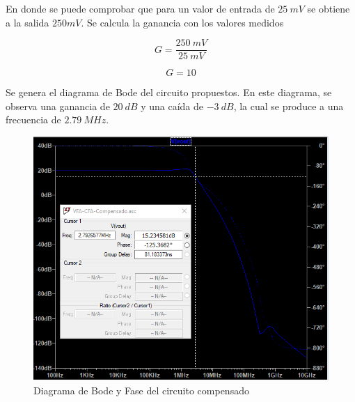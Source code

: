 \hspace{1mm} En donde se puede comprobar que para un valor de entrada de \( 25~mV \) se obtiene a la salida \( 250mV\). Se calcula la ganancia con los valores medidos

\begin{equation}
    G = \frac{250~mV}{25~mV}
\end{equation}

\begin{equation}
    \boxed{
    G = 10
    }
\end{equation}

\hspace{1mm} Se genera el diagrama de Bode del circuito propuestos. En este diagrama, se observa una ganancia de \(20~dB\) y una caída de \(-3~dB\), la cual se produce a una frecuencia de \(2.79~MHz\).

\begin{figure}[H]
    \centering
    \includegraphics[width=0.7\linewidth]{VFA-CFA-Bode-Comp.png}
    \caption{Diagrama de Bode y Fase del circuito compensado}
    \label{fig:enter-label}
\end{figure}